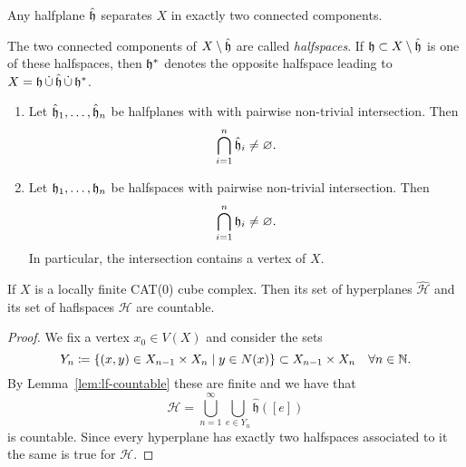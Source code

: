 \begin{thm}
  Any halfplane \(\mathfrak{\hat h}\) separates \(X\) in exactly two connected components.
\end{thm}

\begin{defin}
  The two connected components of \(X \setminus \mathfrak{\hat h}\) are called \emph{halfspaces}. If \(\mathfrak{h} \subset X \setminus \mathfrak{\hat h}\) is one of these halfspaces, then \(\mathfrak{h}^\ast\) denotes the opposite halfspace leading to \(X = \mathfrak{h}\, \dot \cup\, \mathfrak{\hat h}\, \dot \cup\, \mathfrak{h}^\ast \).
\end{defin}

\begin{thm}
  \begin{enumerate}
  \item Let \(\mathfrak{\hat h}_1, \dots, \mathfrak{\hat h}_n\) be halfplanes with with pairwise non-trivial intersection. Then
    \begin{align*}
      \bigcap_{i=1}^n \mathfrak{\hat h}_i \neq \varnothing.
    \end{align*}
  \item Let \(\mathfrak{h}_1, \dots, \mathfrak{h}_n\) be halfspaces with pairwise non-trivial intersection. Then
    \begin{align*}
      \bigcap_{i=1}^n \mathfrak{h}_i \neq \varnothing.
    \end{align*}
    In particular, the intersection contains a vertex of \(X\).
  \end{enumerate}
\end{thm}


\begin{cor}
  If \(X\) is a locally finite CAT(0) cube complex. Then its set of hyperplanes \(\mathcal{\hat H}\) and its set of haflspaces \(\mathcal{H}\) are countable.
\end{cor}

\begin{proof}
  We fix a vertex \(x_0 \in V(X)\) and consider the sets
  \[
    Y_n \coloneqq \{(x,y) \in X_{n-1} \times X_{n} \mid y \in N(x)\} \subset X_{n-1} \times X_n \quad \forall n \in \mathbb{N}.
  \]
  By Lemma~\ref{lem:lf-countable} these are finite and we have that
  \[
    \mathcal{\hat H} = \bigcup_{n=1}^\infty \bigcup_{e \in Y_n} \mathfrak{\hat h}([e])
  \]
  is countable. Since every hyperplane has exactly two halfspaces associated to it the same is true for \(\mathcal{H}\).
\end{proof}

